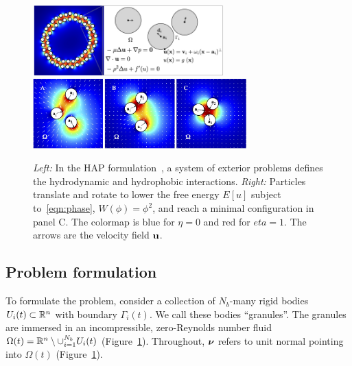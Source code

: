 \begin{figure}
  \begin{center}
    \includegraphics[keepaspectratio,height=2.7cm]{figures/SpecificAim1/Domain.jpg}
    \includegraphics[keepaspectratio,height=2.7cm]{figures/SpecificAim1/3Particles.jpg}
  \end{center}
  \caption{\label{fig:flow_map} \footnotesize {\em Left:} In the HAP
  formulation~\cite{Fu2018_SIAM}, a system of exterior problems defines
  the hydrodynamic and hydrophobic interactions. {\em Right:} Particles
  translate and rotate to lower the free energy $E[u]$ subject
  to~\eqref{eqn:phase}, $W(\phi) = \phi^2$, and reach a minimal
  configuration in panel C. The colormap is blue for $\eta = 0$ and red
  for $eta = 1$. The arrows are the velocity field $\mathbf{u}$.}
\end{figure}

\subsection{Problem formulation}
To formulate the problem, consider a collection of $N_b$-many rigid
bodies $U_i(t) \subset \mathbb{R}^n$ with boundary $\Gamma_i(t)$. We call these
bodies ``granules''. The granules are immersed in an incompressible,
zero-Reynolds number fluid $\Omega(t) = \mathbb{R}^n \setminus \cup_{i=1}^{N_b}
U_i(t)$ (Figure~\ref{fig:flow_map}).
Throughout, $\boldsymbol{\nu}$ refers to unit
normal pointing into $\Omega(t)$ (Figure~\ref{fig:flow_map}).

